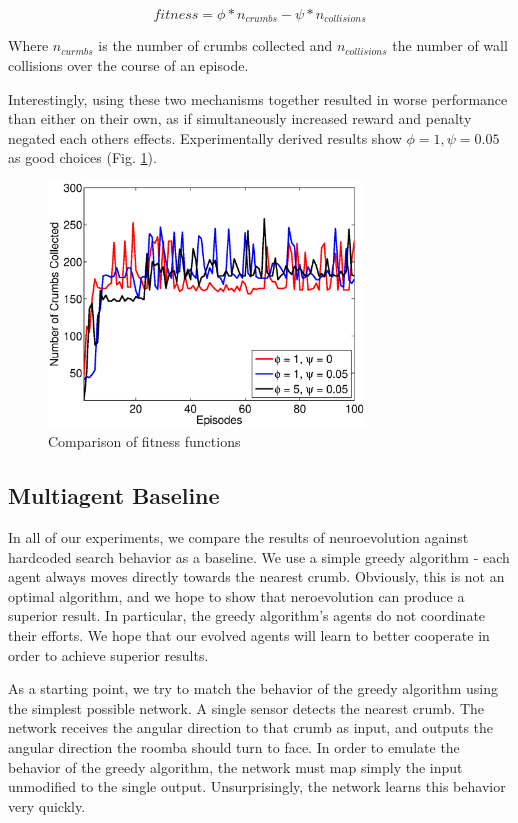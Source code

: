 \documentclass[conference]{IEEEtran}
\begin{document}
\[ fitness = \phi * n_{crumbs} - \psi * n_{collisions}\]

Where $n_{curmbs}$ is the number of crumbs collected and $n_{collisions}$ the number of wall collisions over the course of an episode. 
 
Interestingly, using these two mechanisms together resulted in worse performance than either on their own, as if simultaneously increased reward and penalty negated each others effects. 
Experimentally derived results show $\phi = 1, \psi = 0.05$ as good choices (Fig. \ref{neroevolution:fitness}). 

\begin{figure}[!t]
\centering
\includegraphics[width=3.3in]{./figures/neroevolution/reward.eps}
\caption{Comparison of fitness functions}
\label{neroevolution:fitness}
\end{figure}


\subsection{Multiagent Baseline}

In all of our experiments, we compare the results of neuroevolution against hardcoded search behavior as a baseline. We use a simple greedy algorithm - each agent always moves directly towards the nearest crumb. Obviously, this is not an optimal algorithm, and we hope to show that neroevolution can produce a superior result. In particular, the greedy algorithm's agents do not coordinate their efforts. We hope that our evolved agents will learn to better cooperate in order to achieve superior results.

As a starting point, we try to match the behavior of the greedy algorithm using the simplest possible network. A single sensor detects the nearest crumb. The network receives the angular direction to that crumb as input, and outputs the angular direction the roomba should turn to face. In order to emulate the behavior of the greedy algorithm, the network must map simply the input unmodified to the single output. Unsurprisingly, the network learns this behavior very quickly.
\end{document}
